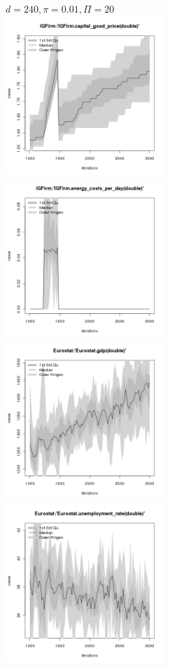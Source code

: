 \begin{figure}[ht!]
\centering\leavevmode
\begin{minipage}{13cm}
\centering\leavevmode
{$d=240, \pi=0.01, \Pi=20$}\\
\includegraphics[width=6cm]{./png/duration_240/intensity_0.01/frequency_20/IGFirm-capital_good_price.png}
\includegraphics[width=6cm]{./png/duration_240/intensity_0.01/frequency_20/IGFirm-energy_costs_per_day.png}
\includegraphics[width=6cm]{./png/duration_240/intensity_0.01/frequency_20/Eurostat-gdp.png}
\includegraphics[width=6cm]{./png/duration_240/intensity_0.01/frequency_20/Eurostat-unemployment_rate.png}
\end{minipage}
\end{figure}


